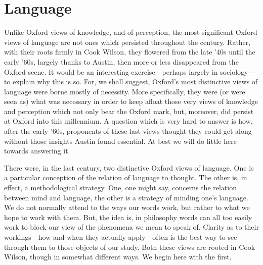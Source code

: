 \section{Language} %
\label{sec:language}

Unlike Oxford views of knowledge, and of perception, the most significant Oxford views of language are not ones which persisted throughout the century. Rather, with their roots firmly in Cook Wilson, they flowered from the late '40s until the early '60s, largely thanks to Austin, then more or less disappeared from the Oxford scene. It would be an interesting exercise---perhaps largely in sociology---to explain why this is so. For, we shall suggest, Oxford's most distinctive views of language were borne mostly of necessity. More specifically, they were (or were seen as) what was necessary in order to keep afloat those very views of knowledge and perception which not only bear the Oxford mark, but, moreover, did persist at Oxford into this millennium. A question which is very hard to answer is how, after the early '60s, proponents of these last views thought they could get along without those insights Austin found essential. At best we will do little here towards answering it.

There were, in the last century, two distinctive Oxford views of language. One is a particular conception of the relation of language to thought. The other is, in effect, a methodological strategy. One, one might say, concerns the relation between mind and language, the other is a strategy of minding one's language. We do not normally attend to the ways our words work, but rather to what we hope to work with them. But, the idea is, in philosophy words can all too easily work to block our view of the phenomena we mean to speak of. Clarity as to their workings---how and when they actually apply---often is the best way to see through them to those objects of our study. Both these views are rooted in Cook Wilson, though in somewhat different ways. We begin here with the first.

